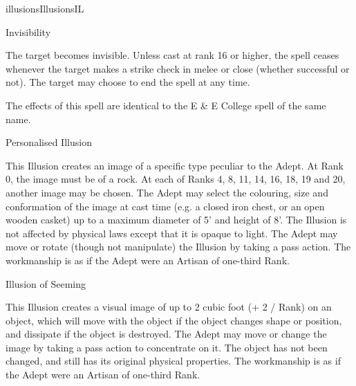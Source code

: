 \begin{College}[1.5]{illusions}{Illusions}{IL}
\begin{spell}[G-4]{Invisibility}

\begin{effects}
The target becomes invisible.  Unless cast at rank 16 or higher, the
spell ceases whenever the target makes a strike check in melee or
close (whether successful or not). The target may choose to end the
spell at any time.

The effects of this spell are identical to the E \& E College spell of
the same name.
\end{effects}
\end{spell}

\begin{spell}[G-5]{Personalised Illusion}

\begin{effects}
This Illusion creates an image of a specific type peculiar to the
Adept.  At Rank 0, the image must be of a rock.  At each of Ranks 4,
8, 11, 14, 16, 18, 19 and 20, another image may be chosen.  The Adept
may select the colouring, size and conformation of the image at cast
time (e.g.  a closed iron chest, or an open wooden casket) up to a
maximum diameter of 5’ and height of 8’.  The Illusion is not affected
by physical laws except that it is opaque to light. The Adept may move
or rotate (though not manipulate) the Illusion by taking a pass
action.  The workmanship is as if the Adept were an Artisan of
one-third Rank.
\end{effects}
\end{spell}

\begin{spell}[G-6]{Illusion of Seeming}

\begin{effects}
This Illusion creates a visual image of up to 2 cubic foot (+ 2 /
Rank) on an object, which will move with the object if the object
changes shape or position, and dissipate if the object is destroyed.
The Adept may move or change the image by taking a pass action to
concentrate on it.  The object has not been changed, and still has its
original physical properties.  The workmanship is as if the Adept were
an Artisan of one-third Rank.


\end{effects}
\end{spell}
\end{College}
